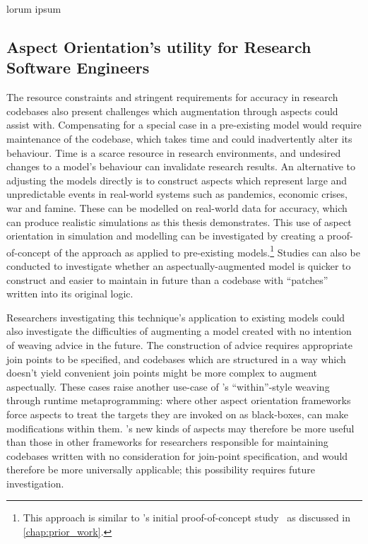 lorum 
ipsum


\subsection{Aspect Orientation's utility for Research Software Engineers}

The resource constraints and stringent requirements for accuracy in research
codebases also present challenges which augmentation through aspects could
assist with. Compensating for a special case in a pre-existing model would
require maintenance of the codebase, which takes time and could inadvertently
alter its behaviour. Time is a scarce resource in research environments, and
undesired changes to a model's behaviour can invalidate research results. An
alternative to adjusting the models directly is to construct aspects which
represent large and unpredictable events in real-world systems such as
pandemics, economic crises, war and famine. These can be modelled on real-world
data for accuracy, which can produce realistic simulations as this thesis
demonstrates. This use of aspect orientation in simulation and modelling can be
investigated by creating a proof-of-concept of the approach as applied to
pre-existing models.\footnote{This approach is similar to \pdsf{}'s initial
proof-of-concept study~\cite{wallis2018caise} as discussed in
\cref{chap:prior_work}.} Studies can also be conducted to investigate
whether an aspectually-augmented model is quicker to construct and easier to
maintain in future than a codebase with ``patches'' written into its original
logic.

Researchers investigating this technique's application to existing models could
also investigate the difficulties of augmenting a model created with no
intention of weaving advice in the future. The construction of advice requires
appropriate join points to be specified, and codebases which are structured in a
way which doesn't yield convenient join points might be more complex to augment
aspectually. These cases raise another use-case of \pdsf{}'s ``within''-style
weaving through runtime metaprogramming: where other aspect orientation
frameworks force aspects to treat the targets they are invoked on as
black-boxes, \pdsf can make modifications within them. \pdsf{}'s new kinds of
aspects may therefore be more useful than those in other frameworks for
researchers responsible for maintaining codebases written with no consideration
for join-point specification, and would therefore be more universally
applicable; this possibility requires future investigation.

